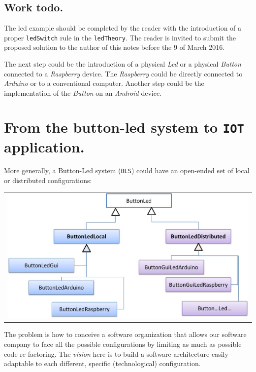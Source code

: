   

\subsection{Work todo.}
The led example should be completed by the reader with the introduction of a proper \texttt{ledSwitch} rule in the \texttt{ledTheory}.
The reader is invited to submit the proposed solution to the author of this notes before the 9 of March 2016.

The next step could be the introduction of a physical \textit{Led} or a physical \textit{Button} connected to a \textit{Raspberry} device. The \textit{Raspberry} could be directly connected to \textit{Arduino} or to a conventional computer. Another step could be the implementation of the \textit{Button} on an \textit{Android} device. 

\section{From the button-led system to \texttt{IOT} application.}
More generally, a Button-Led system (\texttt{BLS}) could have an open-ended set of local or distributed configurations:

\begin{center}
\begin{tabular}{ c }
     \includegraphics[scale = 0.45]{img/blsall.jpg}\\
\end{tabular}{   }
\end{center}

The problem is how to conceive a software organization that allows our software company to face all the possible configurations by limiting as much as possible code re-factoring. The \textit{vision} here is to build a software architecture easily adaptable to each different, specific (technological) configuration. 

